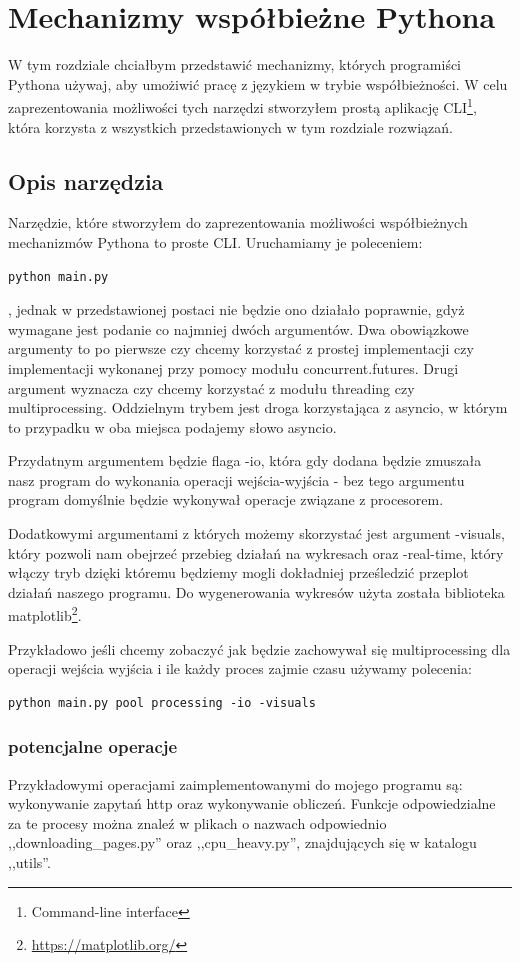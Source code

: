 \chapter{Mechanizmy współbieżne Pythona}
W tym rozdziale chciałbym przedstawić mechanizmy, których programiści Pythona używaj, aby umożiwić pracę z językiem w trybie współbieżności. W celu zaprezentowania możliwości tych narzędzi stworzyłem prostą aplikację CLI\footnote{Command-line interface}, która korzysta z wszystkich przedstawionych w tym rozdziale rozwiązań.

\section{Opis narzędzia}
Narzędzie, które stworzyłem do zaprezentowania możliwości współbieżnych mechanizmów Pythona to proste CLI. Uruchamiamy je poleceniem:
\begin{lstlisting}
python main.py
\end{lstlisting}
, jednak w przedstawionej postaci nie będzie ono działało poprawnie, gdyż wymagane jest podanie co najmniej dwóch argumentów. Dwa obowiązkowe argumenty to po pierwsze czy chcemy korzystać z prostej implementacji czy implementacji wykonanej przy pomocy modułu concurrent.futures. Drugi argument wyznacza czy chcemy korzystać z modułu threading czy multiprocessing. Oddzielnym trybem jest droga korzystająca z asyncio, w którym to przypadku w oba miejsca podajemy słowo asyncio.

Przydatnym argumentem będzie flaga -io, która gdy dodana będzie zmuszała nasz program do wykonania operacji wejścia-wyjścia - bez tego argumentu program domyślnie będzie wykonywał operacje związane z procesorem.

Dodatkowymi argumentami z których możemy skorzystać jest argument -visuals, który pozwoli nam obejrzeć przebieg działań na wykresach oraz -real-time, który włączy tryb dzięki któremu będziemy mogli dokładniej prześledzić przeplot działań naszego programu. Do wygenerowania wykresów użyta została biblioteka matplotlib\footnote{\url{https://matplotlib.org/}}.

Przykładowo jeśli chcemy zobaczyć jak będzie zachowywał się multiprocessing dla operacji wejścia wyjścia i ile każdy proces zajmie czasu używamy polecenia:
\begin{lstlisting}
python main.py pool processing -io -visuals
\end{lstlisting}

\subsection{potencjalne operacje}
Przykładowymi operacjami zaimplementowanymi do mojego programu są: wykonywanie zapytań http oraz wykonywanie obliczeń. Funkcje odpowiedzialne za te procesy można znaleź w plikach o nazwach odpowiednio ,,downloading\_pages.py'' oraz ,,cpu\_heavy.py'', znajdujących się w katalogu ,,utils''.

